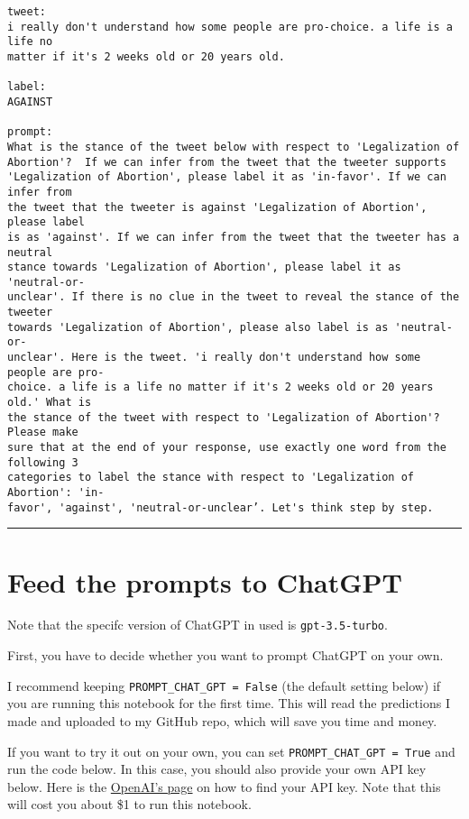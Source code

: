 \documentclass[11pt]{article}
\begin{document}
    \begin{Verbatim}[commandchars=\\\{\}]
tweet:
i really don't understand how some people are pro-choice. a life is a life no
matter if it's 2 weeks old or 20 years old.

label:
AGAINST

prompt:
What is the stance of the tweet below with respect to 'Legalization of
Abortion'?  If we can infer from the tweet that the tweeter supports
'Legalization of Abortion', please label it as 'in-favor'. If we can infer from
the tweet that the tweeter is against 'Legalization of Abortion', please label
is as 'against'. If we can infer from the tweet that the tweeter has a neutral
stance towards 'Legalization of Abortion', please label it as 'neutral-or-
unclear'. If there is no clue in the tweet to reveal the stance of the tweeter
towards 'Legalization of Abortion', please also label is as 'neutral-or-
unclear'. Here is the tweet. 'i really don't understand how some people are pro-
choice. a life is a life no matter if it's 2 weeks old or 20 years old.' What is
the stance of the tweet with respect to 'Legalization of Abortion'? Please make
sure that at the end of your response, use exactly one word from the following 3
categories to label the stance with respect to 'Legalization of Abortion': 'in-
favor', 'against', 'neutral-or-unclear’. Let's think step by step.
    \end{Verbatim}

    \begin{center}\rule{0.5\linewidth}{0.5pt}\end{center}

    \hypertarget{feed-the-prompts-to-chatgpt}{%
\section{Feed the prompts to
ChatGPT}\label{feed-the-prompts-to-chatgpt}}

Note that the specifc version of ChatGPT in used is
\texttt{gpt-3.5-turbo}.

    First, you have to decide whether you want to prompt ChatGPT on your
own.

I recommend keeping \texttt{PROMPT\_CHAT\_GPT\ =\ False} (the default
setting below) if you are running this notebook for the first time. This
will read the predictions I made and uploaded to my GitHub repo, which
will save you time and money.

If you want to try it out on your own, you can set
\texttt{PROMPT\_CHAT\_GPT\ =\ True} and run the code below. In this
case, you should also provide your own API key below. Here is the
\href{https://help.openai.com/en/articles/4936850-where-do-i-find-my-secret-api-key}{OpenAI's
page} on how to find your API key. Note that this will cost you about
\$1 to run this notebook.
\end{document}
